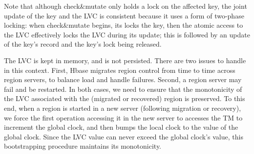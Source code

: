 Note that although check\&mutate only holds a lock on the affected key, the joint update of the key and the LVC is consistent
because it uses a form of two-phase locking: when check\&mutate begins, its locks the key, then the atomic access to the LVC
effectively locks the LVC during its update; this is followed by an update of the key's record and the key's lock being released.


The LVC is kept in memory, and is not persisted. 
There are two issues to handle in this context. First,
Hbase migrates region control from time to time across region servers, to balance load and handle failures. 
Second, a region server may fail and be restarted. 
In both cases, we need to ensure that the monotonicity of the LVC associated with the (migrated or recovered) region is preserved.
To this end, when a region is started in a new server (following migration or recovery), 
we force the first operation accessing it
in the new server to accesses the TM to increment the global clock, and then 
bumps the local clock to the value of the global clock.
Since the LVC value can never exceed the global clock's value, this bootstrapping procedure maintains its monotonicity.



